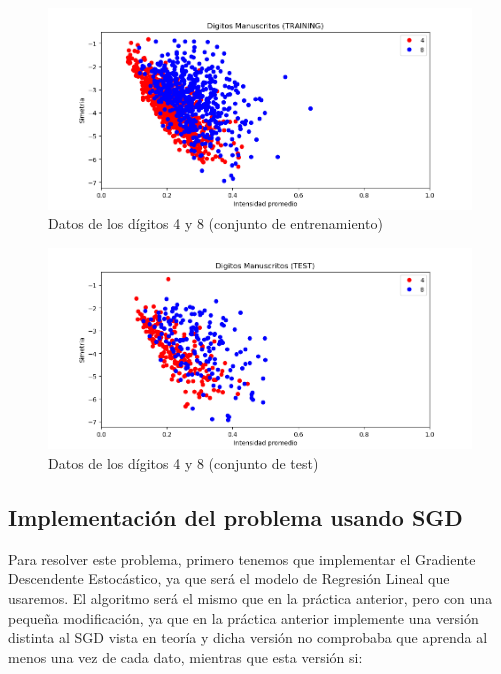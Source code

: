 \documentclass[12pt, spanish]{article}
\begin{document}
\begin{figure}[H]
  \centering
      \includegraphics[scale = 0.70]{datos_bonus.png}
 		 \caption{Datos de los dígitos 4 y 8 (conjunto de entrenamiento)}
  		\label{fig:bonus_entrenamiento}

\end{figure}

\begin{figure}[H]
  \centering
      \includegraphics[scale = 0.70]{datos_bonus_test.png}
 		 \caption{Datos de los dígitos 4 y 8 (conjunto de test)}
  		\label{fig:bonus_test}

\end{figure}

\subsection{Implementación del problema usando SGD}

Para resolver este problema, primero tenemos que implementar el Gradiente Descendente Estocástico, ya que será el modelo de Regresión Lineal que usaremos. El algoritmo será el mismo que en la práctica anterior, pero con una pequeña modificación, ya que en la práctica anterior implemente una versión distinta al SGD vista en teoría y dicha versión no comprobaba que aprenda al menos una vez de cada dato, mientras que esta versión si:
\end{document}

